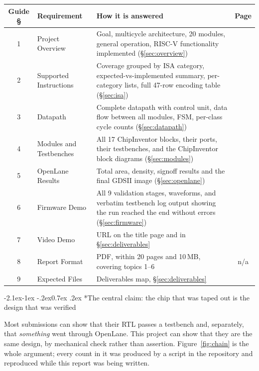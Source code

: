 \documentclass[11pt,a4paper]{article}
\makeatletter
\renewcommand\subsection{\@startsection{subsection}{2}{\z@}%
  {-2.1ex\@plus -1ex \@minus -.2ex}{0.7ex \@plus .2ex}%
  {\color{rvbldark}\normalfont\normalsize\bfseries}}
\newcommand{\hdr}[1]{\textbf{#1}}
\newcommand{\hrow}{\rowcolor{rvbltint}}
\makeatother
\begin{document}
\vspace{-2pt}
{\small
\begin{tabularx}{\linewidth}{c>{\raggedright\arraybackslash}p{3.5cm}Xc}
\toprule
\hrow \hdr{Guide \S} & \hdr{Requirement} & \hdr{How it is answered} & \hdr{Page} \\
\midrule
1 & Project Overview & Goal, multicycle architecture, 20 modules, general operation,
    RISC-V functionality implemented (\S\ref{sec:overview}) & \pageref{sec:overview} \\
2 & Supported Instructions & Coverage grouped by ISA category, expected-vs-implemented
    summary, per-category lists, full 47-row encoding table (\S\ref{sec:isa}) &
    \pageref{sec:isa} \\
3 & Datapath & Complete datapath with control unit, data flow between all modules,
    FSM, per-class cycle counts (\S\ref{sec:datapath}) & \pageref{sec:datapath} \\
4 & Modules and Testbenches & All 17 ChipInventor blocks, their ports, their
    testbenches, and the ChipInventor block diagrams (\S\ref{sec:modules}) &
    \pageref{sec:modules} \\
5 & OpenLane Results & Total area, density, signoff results and the final GDSII image
    (\S\ref{sec:openlane}) & \pageref{sec:openlane} \\
6 & Firmware Demo & All 9 validation stages, waveforms, and verbatim testbench log
    output showing the run reached the end without errors (\S\ref{sec:firmware}) &
    \pageref{sec:firmware} \\
7 & Video Demo & URL on the title page and in \S\ref{sec:deliverables} &
    \pageref{sec:compliance} \\
8 & Report Format & PDF, within 20 pages and 10\,MB, covering topics 1--6 & n/a \\
9 & Expected Files & Deliverables map, \S\ref{sec:deliverables} &
    \pageref{sec:deliverables} \\
\bottomrule
\end{tabularx}}

\vspace{4pt}
\subsection*{\color{rvbldark}The central claim: the chip that was taped out is the design
that was verified}

Most submissions can show that their RTL passes a testbench and, separately, that
\emph{something} went through OpenLane. This project can show that they are the same
design, by mechanical check rather than assertion. Figure~\ref{fig:chain} is the whole
argument; every count in it was produced by a script in the repository and reproduced while
this report was being written.
\end{document}
